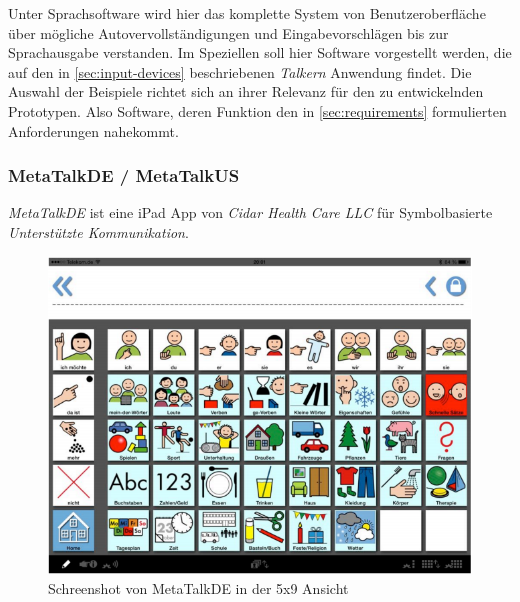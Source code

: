     	Unter Sprachsoftware wird hier das komplette System von Benutzeroberfläche über mögliche Autovervollständigungen und Eingabevorschlägen bis zur Sprachausgabe verstanden. Im Speziellen soll hier Software vorgestellt werden, die auf den in \autoref{sec:input-devices} beschriebenen \emph{Talkern} Anwendung findet. Die Auswahl der Beispiele richtet sich an ihrer Relevanz für den zu entwickelnden Prototypen. Also Software, deren Funktion den in \autoref{sec:requirements} formulierten Anforderungen nahekommt.
        
        \newpage
        \subsubsection*{MetaTalkDE / MetaTalkUS}
        	\emph{MetaTalkDE} ist eine iPad App von \emph{Cidar Health Care LLC} für Symbolbasierte \emph{Unterstützte Kommunikation}.
            
            \begin{figure}[H]
				\centering
				\includegraphics[width=.6\linewidth]{images/Metatalk.png}
                \caption{Schreenshot von MetaTalkDE in der 5x9 Ansicht
                	\parencite[S. 8]{cidar:metaTalkManual}
                }
				\label{fig:metatalk}
			\end{figure}
            
